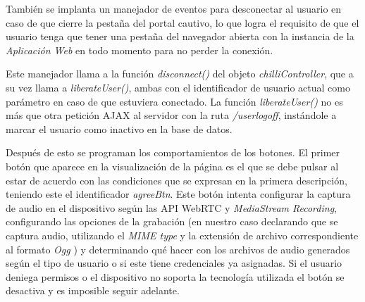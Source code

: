 También se implanta un manejador de eventos para desconectar al usuario en caso de que cierre la pestaña del portal cautivo, lo que logra el requisito de que el usuario tenga que tener una pestaña del navegador abierta con la instancia de la \emph{Aplicación Web} en todo momento para no perder la conexión.


Este manejador llama a la función \emph{disconnect()} del objeto \emph{chilliController}, que a su vez llama a \emph{liberateUser()}, ambas con el identificador de usuario actual como parámetro en caso de que estuviera conectado. La función \emph{liberateUser()} no es más que otra petición AJAX al servidor con la ruta \emph{/userlogoff}, instándole a marcar el usuario como inactivo en la base de datos.


Después de esto se programan los comportamientos de los botones. El primer botón que aparece en la visualización de la página es el que se debe pulsar al estar de acuerdo con las condiciones que se expresan en la primera descripción, teniendo este el identificador \emph{agreeBtn}. Este botón intenta configurar la captura de audio en el dispositivo según las API WebRTC y \emph{MediaStream Recording}, configurando las opciones de la grabación (en nuestro caso declarando que se captura audio, utilizando el \emph{\acrshort{MIME} type} y la extensión de archivo correspondiente al formato \emph{Ogg} \cite{OggRFC1, OggRFC2}) y determinando qué hacer con los archivos de audio generados según el tipo de usuario o si este tiene credenciales ya asignadas. Si el usuario deniega permisos o el dispositivo no soporta la tecnología utilizada el botón se desactiva y es imposible seguir adelante.

